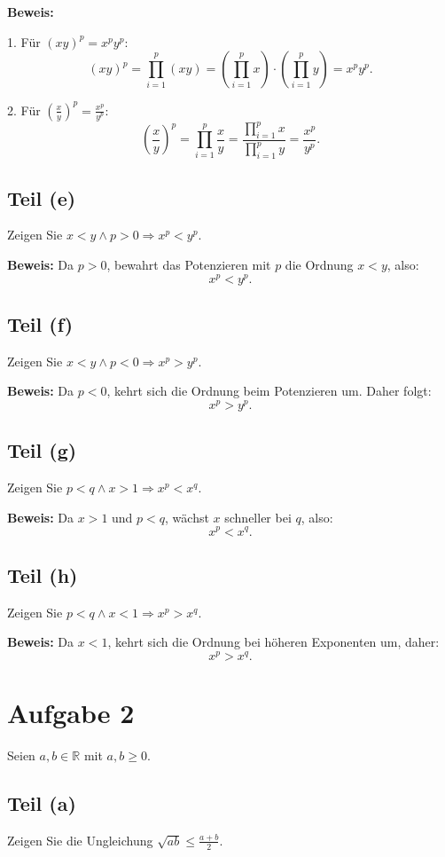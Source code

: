 \documentclass[11pt]{article}
\begin{document}
\textbf{Beweis:}

1. Für \( (xy)^p = x^p y^p \):
   \[
   (xy)^p = \prod_{i=1}^{p} (xy) = \left( \prod_{i=1}^{p} x \right) \cdot \left( \prod_{i=1}^{p} y \right) = x^p y^p.
   \]

2. Für \( \left( \frac{x}{y} \right)^p = \frac{x^p}{y^p} \):
   \[
   \left( \frac{x}{y} \right)^p = \prod_{i=1}^{p} \frac{x}{y} = \frac{\prod_{i=1}^{p} x}{\prod_{i=1}^{p} y} = \frac{x^p}{y^p}.
   \]

\subsection*{Teil (e)}
Zeigen Sie \( x < y \land p > 0 \Rightarrow x^p < y^p \).

\textbf{Beweis:} Da \( p > 0 \), bewahrt das Potenzieren mit \( p \) die Ordnung \( x < y \), also:
\[
x^p < y^p.
\]

\subsection*{Teil (f)}
Zeigen Sie \( x < y \land p < 0 \Rightarrow x^p > y^p \).

\textbf{Beweis:} Da \( p < 0 \), kehrt sich die Ordnung beim Potenzieren um. Daher folgt:
\[
x^p > y^p.
\]

\subsection*{Teil (g)}
Zeigen Sie \( p < q \land x > 1 \Rightarrow x^p < x^q \).

\textbf{Beweis:} Da \( x > 1 \) und \( p < q \), wächst \( x \) schneller bei \( q \), also:
\[
x^p < x^q.
\]

\subsection*{Teil (h)}
Zeigen Sie \( p < q \land x < 1 \Rightarrow x^p > x^q \).

\textbf{Beweis:} Da \( x < 1 \), kehrt sich die Ordnung bei höheren Exponenten um, daher:
\[
x^p > x^q.
\]

\section*{Aufgabe 2}

Seien \( a, b \in \mathbb{R} \) mit \( a, b \geq 0 \).

\subsection*{Teil (a)}
Zeigen Sie die Ungleichung \( \sqrt{ab} \leq \frac{a + b}{2} \).
\end{document}
